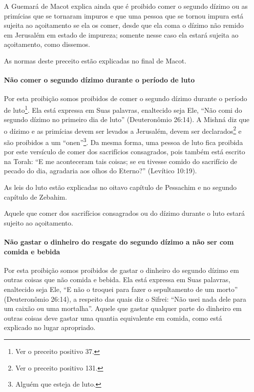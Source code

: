 A Guemará de Macot explica ainda que é proibido comer o segundo dízimo
ou as primícias que se tornaram impuros e que uma pessoa que se tornou
impura está sujeita ao açoitamento se ela os comer, desde que ela coma o
dízimo não remido em Jerusalém em estado de impureza; somente nesse
caso ela estará sujeita ao açoitamento, como dissemos.

As normas deste preceito estão explicadas no final de Macot.

\paragraph{Não comer o segundo dízimo durante o período de luto}

Por esta proibição somos proibidos de comer o segundo dízimo durante o
período de luto\footnote{Ver o preceito positivo 37.}. Ela está expressa em Suas
palavras, enaltecido seja Ele, ``Não comi do segundo dízimo no primeiro
dia de luto'' (Deuteronômio 26:14). A Mishná diz que o dízimo e as
primícias devem ser levados a Jerusalém, devem ser
declarados\footnote{Ver o preceito positivo 131.} e são proibidos a um
``onen''\footnote{Alguém que esteja de luto.}. Da mesma forma, uma pessoa de luto fica
proibida por este versículo de comer dos sacrifícios consagrados, pois
também está escrito na Torah: ``E me aconteceram tais coisas; se eu
tivesse comido do sacrifício de pecado do dia, agradaria aos olhos do
Eterno?'' (Levítico 10:19).

As leis do luto estão explicadas no oitavo capítulo de Pessachim e no
segundo capítulo de Zebahim.

Aquele que comer dos sacrifícios consagrados ou do dízimo durante o
luto estará sujeito ao açoitamento.

\paragraph{Não gastar o dinheiro do resgate do segundo dízimo a não ser com
comida e bebida}

Por esta proibição somos proibidos de gastar o dinheiro do segundo
dízimo em outras coisas que não comida e bebida. Ela está expressa em
Suas palavras, enaltecido seja Ele, ``E não o troquei para fazer o
sepultamento de um morto'' (Deuteronômio 26:14), a respeito das quais
diz o Sifrei: ``Não usei nada dele para um caixão ou uma mortalha''.
Aquele que gastar qualquer parte do dinheiro em outras coisas deve
gastar uma quantia equivalente em comida, como está explicado no lugar
apropriado.

